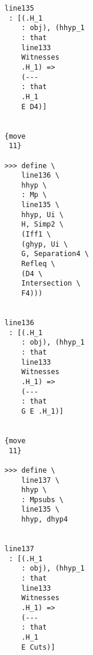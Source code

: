 \documentclass[12pt]{article}
\begin{document}
\begin{verbatim}
                                    line135 
                                     : [(.H_1 
                                        : obj), (hhyp_1 
                                        : that 
                                        line133 
                                        Witnesses 
                                        .H_1) => 
                                        (--- 
                                        : that 
                                        .H_1 
                                        E D4)]


                                    {move 
                                     11}

                                    >>> define \
                                        line136 \
                                        hhyp \
                                        : Mp \
                                        line135 \
                                        hhyp, Ui \
                                        H, Simp2 \
                                        (Iff1 \
                                        (ghyp, Ui \
                                        G, Separation4 \
                                        Refleq \
                                        (D4 \
                                        Intersection \
                                        F4)))


                                    line136 
                                     : [(.H_1 
                                        : obj), (hhyp_1 
                                        : that 
                                        line133 
                                        Witnesses 
                                        .H_1) => 
                                        (--- 
                                        : that 
                                        G E .H_1)]


                                    {move 
                                     11}

                                    >>> define \
                                        line137 \
                                        hhyp \
                                        : Mpsubs \
                                        line135 \
                                        hhyp, dhyp4


                                    line137 
                                     : [(.H_1 
                                        : obj), (hhyp_1 
                                        : that 
                                        line133 
                                        Witnesses 
                                        .H_1) => 
                                        (--- 
                                        : that 
                                        .H_1 
                                        E Cuts)]



\end{verbatim}
\end{document}
